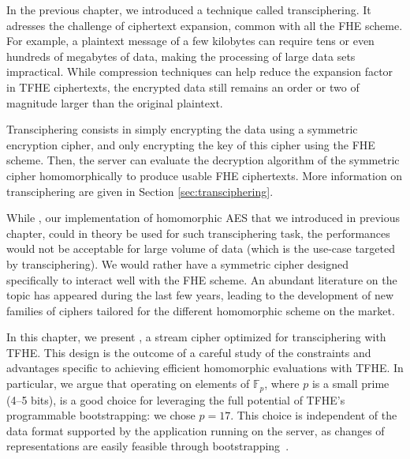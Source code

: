 
In the previous chapter, we introduced a technique called transciphering. It adresses the challenge of ciphertext expansion, common with all the FHE scheme.  For example, a plaintext message of a few kilobytes can require tens or even hundreds of megabytes of data, making the processing of large data sets impractical. While compression techniques can help reduce the expansion factor in TFHE ciphertexts, the encrypted data still remains an order or two of magnitude larger than the original plaintext.


Transciphering consists in simply encrypting the data using a symmetric encryption cipher, and only encrypting the key of this cipher using the FHE scheme. Then, the server can evaluate the decryption algorithm of the symmetric cipher homomorphically to produce usable FHE ciphertexts. More information on transciphering are given in Section \ref{sec:transciphering}.


While \hippo, our implementation of homomorphic AES that we introduced in previous chapter, could in theory be used for such transciphering task, the performances would not be acceptable for large volume of data (which is the use-case targeted by transciphering). We would rather have a symmetric cipher designed specifically to interact well with the FHE scheme. An abundant literature on the topic has appeared during the last few years, leading to the development of new families of ciphers tailored for the different homomorphic scheme on the market.

In this chapter, we present \coolName{}, a stream cipher optimized for transciphering with TFHE. This design is the outcome of a careful study of the constraints and advantages specific to achieving efficient homomorphic evaluations with TFHE. In particular, we argue that operating on elements of $\mathbb{F}_p$, where $p$ is a small prime (4--5 bits), is a good choice for leveraging the full potential of TFHE’s programmable bootstrapping: we chose $p=17$. This choice is independent of the data format supported by the application running on the server, as changes of representations are easily feasible through bootstrapping~\cite{JC:BBBCLO23}.


